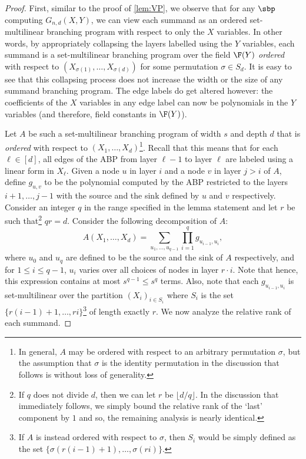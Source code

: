 \documentclass{article}
\begin{document}
\begin{proof}
First, similar to the proof of \autoref{lem:VP}, we observe that for any $\sbp$ computing $G_{n,d}(X,Y)$, we can view each summand as an ordered set-multilinear branching program with respect to only the $X$ variables. In other words, by appropriately collapsing the layers labelled using the $Y$ variables, each summand is a set-multilinear branching program over the field $\F(Y)$ \emph{ordered} with respect to $(X_{\sigma(1)},\ldots, X_{\sigma(d)})$ for some permutation $\sigma\in S_d$. It is easy to see that this collapsing process does not  increase the width or the size of any summand branching program.  The edge labels do get altered however: the coefficients of the $X$ variables in any edge label can now be polynomials in the $Y$ variables (and therefore, field constants in $\F(Y)$).


Let $A$ be such a set-multilinear branching program of width $s$ and depth $d$ that is \emph{ordered} with respect to $(X_1,\ldots, X_d)$\footnote{In general, $A$ may be ordered with respect to an arbitrary permutation $\sigma$, but the assumption that $\sigma$ is the identity permutation in the discussion that follows is without loss of generality.}. Recall that this means that for each $\ell\in[d]$, all edges of the ABP from layer $\ell-1$ to layer $\ell$ are labeled using a linear form {in} $\mathit{X_\ell}$. Given a node $u$ in layer $i$ and a node $v$ in layer $j>i$ of $A$, define $g_{u,v}$ to be the polynomial computed by the ABP restricted to the layers $i+1,\ldots,j-1$ with the source and the sink defined by $u$ and $v$ respectively. Consider an integer $q$ in the range specified in the lemma statement and let $r$ be such that\footnote{\label{foot:rdq} If $q$ does not divide $d$, then we can let $r$ be $\lfloor d/q\rfloor$. In the discussion that immediately follows, we simply bound the relative rank of the `last' component by $1$ and so, the remaining analysis is nearly identical.} $qr = d$. Consider the following decomposition of $A$:
\[
A(X_1,\ldots,X_d) = \sum_{u_1,\ldots, u_{q-1}} \prod_{i = 1}^{q} g_{u_{i-1},u_i},
\]
where $u_0$ and $u_{q}$ are defined to be the source and the sink of $A$ respectively, and for $1\leq i \leq q-1$, $u_i$ varies over all choices of nodes in layer $r\cdot i$. Note that hence, this expression contains at most $s^{q-1}\leq s^q$ terms. Also, note that each $g_{u_{i-1},u_i}$ is set-multilinear over the partition $(X_i)_{i\in S_i}$ where $S_i$ is the set $\{r(i-1) + 1, \ldots, ri\}$\footnote{If $A$ is instead  ordered with respect to $\sigma$, then $S_i$ would be simply defined as the set $\{\sigma(r(i-1) + 1), \ldots, \sigma(ri)\}$.} of length exactly $r$. We now analyze the relative rank of each summand. 


\end{proof}
\end{document}
